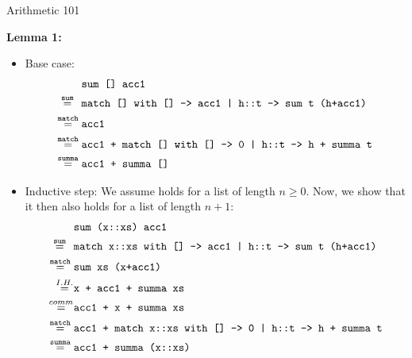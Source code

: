 \documentclass[
  english
]{tumteaching}
\newcommand{\qsmio}[1]{\text{\texttt{#1}}}
\begin{document}
\begin{assignment}[L]{Arithmetic 101}
\begin{solution}
    \vspace*{3mm}
    \noindent \textbf{Lemma 1:} 
    \begin{itemize}
      \item Base case: 
      \begin{align*}
        &\;\qsmio{sum [] acc1}\\
        \overset{\qsmio{sum}}{=}\hspace*{1.5mm}&\;\qsmio{match [] with [] -> acc1 | h::t -> sum t (h+acc1)}\\
        \overset{\qsmio{match}}{=}&\;\qsmio{acc1}\\
        \overset{\qsmio{match}}{=}&\;\qsmio{acc1 + match [] with [] -> 0 | h::t -> h + summa t}\\
        \overset{\qsmio{summa}}{=}&\;\qsmio{acc1 + summa []}\\
      \end{align*}
      \item Inductive step: We assume  holds for a list  of length $n \geq 0$. Now, we show that it then also holds for a list  of length $n+1$:
      \begin{align*}
        &\;\qsmio{sum (x::xs) acc1}\\
        \overset{\qsmio{sum}}{=}\hspace*{1.5mm}&\;\qsmio{match x::xs with [] -> acc1 | h::t -> sum t (h+acc1)}\\
        \overset{\qsmio{match}}{=}&\;\qsmio{sum xs (x+acc1)}\\
        \overset{I.H.}{=}\hspace*{-0.8mm}&\;\qsmio{x + acc1 + summa xs}\\
        \overset{comm}{=}\hspace*{-0.8mm}&\;\qsmio{acc1 + x + summa xs}\\
        \overset{\qsmio{match}}{=}&\;\qsmio{acc1 + match x::xs with [] -> 0 | h::t -> h + summa t}\\
        \overset{\qsmio{summa}}{=}&\;\qsmio{acc1 + summa (x::xs)}\\
      \end{align*}
    \end{itemize}


\end{solution}
\end{assignment}
\end{document}

